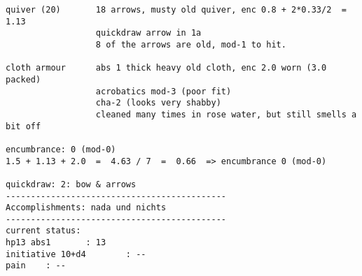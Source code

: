 \begin{samepage}
\begin{verbatim}
quiver (20)       18 arrows, musty old quiver, enc 0.8 + 2*0.33/2  = 1.13
                  quickdraw arrow in 1a
                  8 of the arrows are old, mod-1 to hit.

cloth armour      abs 1 thick heavy old cloth, enc 2.0 worn (3.0 packed)
                  acrobatics mod-3 (poor fit)
                  cha-2 (looks very shabby)
                  cleaned many times in rose water, but still smells a bit off

encumbrance: 0 (mod-0)
1.5 + 1.13 + 2.0  =  4.63 / 7  =  0.66  => encumbrance 0 (mod-0)

quickdraw: 2: bow & arrows
--------------------------------------------
Accomplishments: nada und nichts
--------------------------------------------
current status:
hp13 abs1       : 13
initiative 10+d4        : --
pain    : --
\end{verbatim} \end{samepage} \normalsize


\

